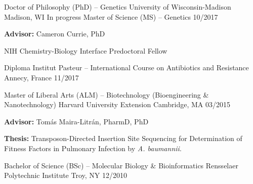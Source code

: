 {}

\begin{cventries}
\cventry
	{Doctor of Philosophy (PhD) -- Genetics}
	{University of Wisconsin-Madison}
	{Madison, WI}
	{In progress}
	{}
	\vspace{-0.4cm}
\cventry
	{Master of Science (MS) -- Genetics}
	{}
	{}
	{10/2017}
	{
      \begin{cvitems}
      	\item {\textbf{Advisor:} Cameron Currie, PhD}
      	\item {NIH Chemistry-Biology Interface Predoctoral Fellow}
      \end{cvitems}
    }
    
\cventry
	{Diploma}
	{Institut Pasteur -- International Course on Antibiotics and Resistance}
	{Annecy, France}
	{11/2017}
	{} \vspace{-4mm}
    
\cventry
	{Master of Liberal Arts (ALM) -- Biotechnology (Bioengineering \& Nanotechnology)}
	{Harvard University Extension}
	{Cambridge, MA}
	{03/2015}
	{
      \begin{cvitems}
      	\item {\textbf{Advisor:} Tom\'{a}s Maira-Litr\'{a}n, PharmD, PhD}
      	\item {\textbf{Thesis:} Transposon-Directed Insertion Site Sequencing for Determination of Fitness Factors in Pulmonary Infection by \textit{A. baumannii}.}
      \end{cvitems}
    }

\cventry
	{Bachelor of Science (BSc) -- Molecular Biology \& Bioinformatics}
	{Rensselaer Polytechnic Institute}
	{Troy, NY}
	{12/2010}
	{}
\end{cventries}

\vspace{-7mm}